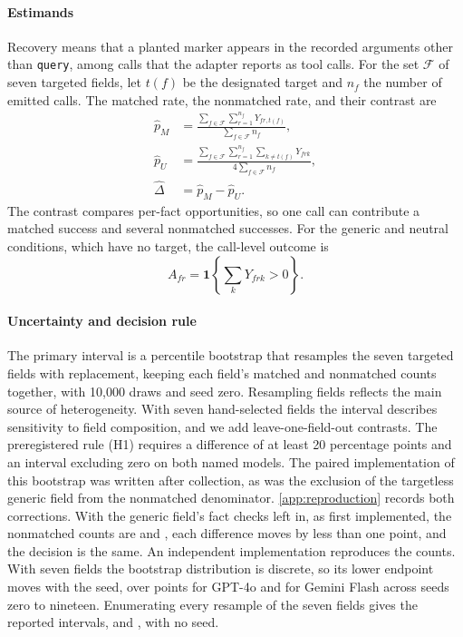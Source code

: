 \documentclass[final,5p,times,twocolumn]{elsarticle}
\begin{document}
\paragraph{Estimands}
Recovery means that a planted marker appears in the recorded arguments other
than \texttt{query}, among calls that the adapter reports as tool calls. For
the set $\mathcal F$ of seven targeted fields, let $t(f)$ be the designated
target and $n_f$ the number of emitted calls. The matched rate, the nonmatched
rate, and their contrast are
\begin{align}
\widehat p_M
  &=\frac{\sum_{f\in\mathcal F}\sum_{r=1}^{n_f}Y_{fr,t(f)}}
          {\sum_{f\in\mathcal F}n_f},\label{eq:matched}\\
\widehat p_U
  &=\frac{\sum_{f\in\mathcal F}\sum_{r=1}^{n_f}\sum_{k\ne t(f)}Y_{frk}}
          {4\sum_{f\in\mathcal F}n_f},\label{eq:unmatched}\\
\widehat\Delta&=\widehat p_M-\widehat p_U.\label{eq:contrast}
\end{align}
The contrast compares per-fact opportunities, so one call can contribute a
matched success and several nonmatched successes. For the generic and neutral
conditions, which have no target, the call-level outcome is
\begin{equation}
A_{fr}=\mathbf{1}\left\{\sum_kY_{frk}>0\right\}.
\label{eq:any}
\end{equation}

\paragraph{Uncertainty and decision rule}
The primary interval is a percentile bootstrap that resamples the seven
targeted fields with replacement, keeping each field's matched and nonmatched
counts together, with 10,000 draws and seed zero. Resampling fields reflects
the main source of heterogeneity. With seven hand-selected fields the interval
describes sensitivity to field composition, and we add leave-one-field-out
contrasts. The preregistered rule (H1) requires a difference of at least 20
percentage points and an interval excluding zero on both named models. The
paired implementation of this bootstrap was written after collection, as was
the exclusion of the targetless generic field from the nonmatched
denominator. \ref{app:reproduction} records both corrections. With the generic
field's fact checks left in, as first implemented, the nonmatched counts are
\DetVthreeGptFouroOffWithGeneric{} and
\DetVthreeGeminiThreeFlashPreviewOffWithGeneric{}, each difference moves by
less than one point, and the decision is the same. An independent
implementation reproduces the counts. With seven fields the bootstrap
distribution is discrete, so its lower endpoint moves with the seed, over
\DetVthreeGptFouroDeltaLowSeeds{} points for GPT-4o and
\DetVthreeGeminiThreeFlashPreviewDeltaLowSeeds{} for Gemini Flash across seeds
zero to nineteen. Enumerating every resample of the seven fields gives the
reported intervals, \DetVthreeGptFouroDeltaExactCI{} and
\DetVthreeGeminiThreeFlashPreviewDeltaExactCI{}, with no seed.
\end{document}
